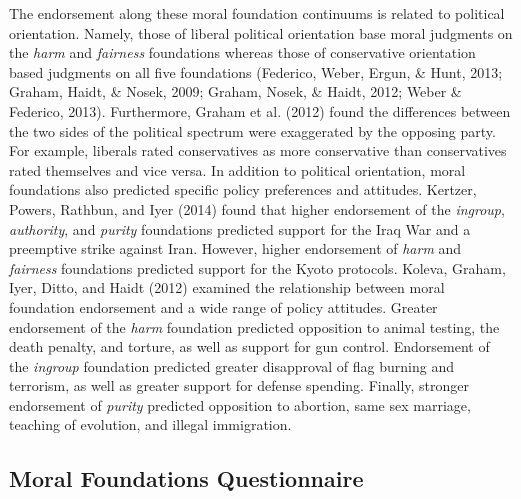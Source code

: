 \documentclass[english,man]{apa6}
\theoremstyle{definition}
\theoremstyle{definition}
\theoremstyle{definition}
\theoremstyle{remark}
\begin{document}
The endorsement along these moral foundation continuums is related to
political orientation. Namely, those of liberal political orientation
base moral judgments on the \emph{harm} and \emph{fairness} foundations
whereas those of conservative orientation based judgments on all five
foundations (Federico, Weber, Ergun, \& Hunt, 2013; Graham, Haidt, \&
Nosek, 2009; Graham, Nosek, \& Haidt, 2012; Weber \& Federico, 2013).
Furthermore, Graham et al. (2012) found the differences between the two
sides of the political spectrum were exaggerated by the opposing party.
For example, liberals rated conservatives as more conservative than
conservatives rated themselves and vice versa. In addition to political
orientation, moral foundations also predicted specific policy
preferences and attitudes. Kertzer, Powers, Rathbun, and Iyer (2014)
found that higher endorsement of the \emph{ingroup}, \emph{authority},
and \emph{purity} foundations predicted support for the Iraq War and a
preemptive strike against Iran. However, higher endorsement of
\emph{harm} and \emph{fairness} foundations predicted support for the
Kyoto protocols. Koleva, Graham, Iyer, Ditto, and Haidt (2012) examined
the relationship between moral foundation endorsement and a wide range
of policy attitudes. Greater endorsement of the \emph{harm} foundation
predicted opposition to animal testing, the death penalty, and torture,
as well as support for gun control. Endorsement of the \emph{ingroup}
foundation predicted greater disapproval of flag burning and terrorism,
as well as greater support for defense spending. Finally, stronger
endorsement of \emph{purity} predicted opposition to abortion, same sex
marriage, teaching of evolution, and illegal immigration.

\subsection{Moral Foundations
Questionnaire}\label{moral-foundations-questionnaire}
\end{document}
